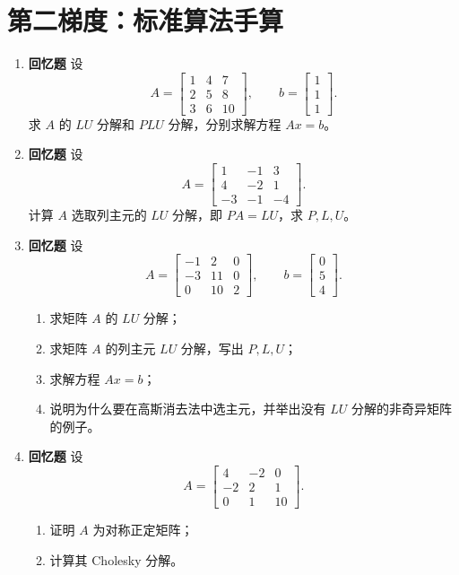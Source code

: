 \documentclass{article}
\newcommand{\oldtag}{\textcolor{red!65!black}{\textbf{回忆题}}}
\begin{document}
\section{第二梯度：标准算法手算}

\begin{enumerate}
  \item \oldtag{} 设
  \[
    A=\begin{bmatrix}1&4&7\\2&5&8\\3&6&10\end{bmatrix},\qquad
    b=\begin{bmatrix}1\\1\\1\end{bmatrix}.
  \]
  求 $A$ 的 $LU$ 分解和 $PLU$ 分解，分别求解方程 $Ax=b$。

  \item \oldtag{} 设
  \[
    A=\begin{bmatrix}1&-1&3\\4&-2&1\\-3&-1&-4\end{bmatrix}.
  \]
  计算 $A$ 选取列主元的 $LU$ 分解，即 $PA=LU$，求 $P,L,U$。

  \item \oldtag{} 设
  \[
    A=\begin{bmatrix}-1&2&0\\-3&11&0\\0&10&2\end{bmatrix},\qquad
    b=\begin{bmatrix}0\\5\\4\end{bmatrix}.
  \]
  \begin{enumerate}[(1)]
    \item 求矩阵 $A$ 的 $LU$ 分解；
    \item 求矩阵 $A$ 的列主元 $LU$ 分解，写出 $P,L,U$；
    \item 求解方程 $Ax=b$；
    \item 说明为什么要在高斯消去法中选主元，并举出没有 $LU$ 分解的非奇异矩阵的例子。
  \end{enumerate}

  \item \oldtag{} 设
  \[
    A=\begin{bmatrix}4&-2&0\\-2&2&1\\0&1&10\end{bmatrix}.
  \]
  \begin{enumerate}[(1)]
    \item 证明 $A$ 为对称正定矩阵；
    \item 计算其 Cholesky 分解。
  \end{enumerate}


\end{enumerate}
\end{document}
